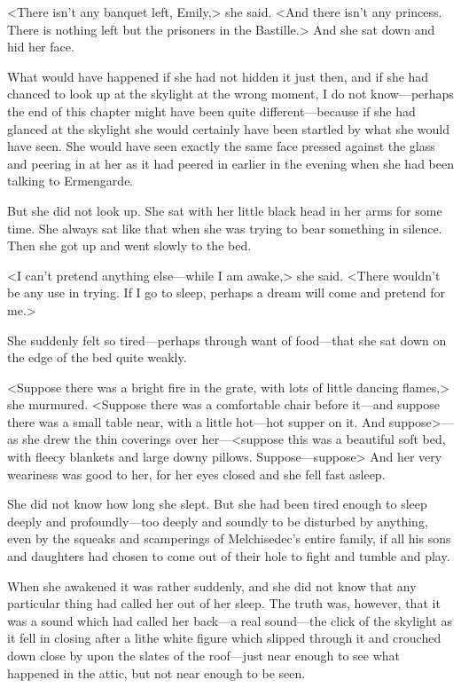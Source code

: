 <There isn't any banquet left, Emily,> she said. <And there isn't any princess. There is nothing left but the prisoners in the Bastille.> And she sat down and hid her face.

What would have happened if she had not hidden it just then, and if she had chanced to look up at the skylight at the wrong moment, I do not know—perhaps the end of this chapter might have been quite different—because if she had glanced at the skylight she would certainly have been startled by what she would have seen. She would have seen exactly the same face pressed against the glass and peering in at her as it had peered in earlier in the evening when she had been talking to Ermengarde.

But she did not look up. She sat with her little black head in her arms for some time. She always sat like that when she was trying to bear something in silence. Then she got up and went slowly to the bed.

<I can't pretend anything else—while I am awake,> she said. <There wouldn't be any use in trying. If I go to sleep, perhaps a dream will come and pretend for me.>

She suddenly felt so tired—perhaps through want of food—that she sat down on the edge of the bed quite weakly.

<Suppose there was a bright fire in the grate, with lots of little dancing flames,> she murmured. <Suppose there was a comfortable chair before it—and suppose there was a small table near, with a little hot—hot supper on it. And suppose>—as she drew the thin coverings over her—<suppose this was a beautiful soft bed, with fleecy blankets and large downy pillows. Suppose—suppose\longdash> And her very weariness was good to her, for her eyes closed and she fell fast asleep.


She did not know how long she slept. But she had been tired enough to sleep deeply and profoundly—too deeply and soundly to be disturbed by anything, even by the squeaks and scamperings of Melchisedec's entire family, if all his sons and daughters had chosen to come out of their hole to fight and tumble and play.

When she awakened it was rather suddenly, and she did not know that any particular thing had called her out of her sleep. The truth was, however, that it was a sound which had called her back—a real sound—the click of the skylight as it fell in closing after a lithe white figure which slipped through it and crouched down close by upon the slates of the roof—just near enough to see what happened in the attic, but not near enough to be seen.

